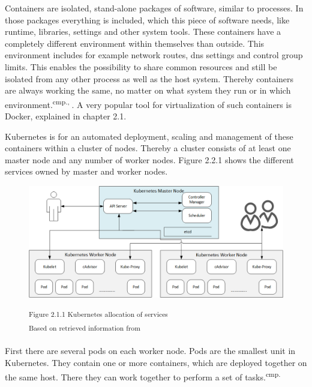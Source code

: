 
Containers are isolated, stand-alone packages of software, similar to processes. In those packages everything is included, which this piece of software needs, like runtime, libraries, settings and other system tools.  These containers have a completely different environment within themselves than outside. This environment includes for example network routes, dns settings and control group limits. This enables the possibility to share common resources and still be isolated from any other process as well as the host system. Thereby containers are always working the same, no matter on what system they run or in which environment.\textsuperscript{cmp.\cite{19}, \cite{20}}. A very popular tool for virtualization of such containers is Docker, explained in chapter 2.1.


Kubernetes is for an automated deployment, scaling and management of these containers within a cluster of nodes. Thereby a cluster consists of at least one master node and any number of worker nodes. Figure 2.2.1 shows the different services owned by master and worker nodes.

\begin{figure}[h]
\centering
\includegraphics[width=\textwidth/5*3]{images/kubernetes_service_allocation.png}

\textsuperscript{Figure 2.1.1 Kubernetes allocation of services}\\
\textsuperscript{Based on retrieved information from \cite{19}}
\end{figure}

First there are several pods on each worker node. Pods are the smallest unit in Kubernetes. They contain one or more containers, which are deployed together on the same host. There they can work together to perform a set of tasks.\textsuperscript{cmp.\cite{21}}%

